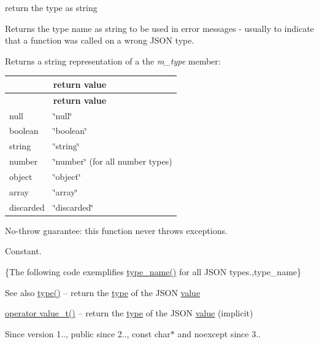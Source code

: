 return the type as string 

Returns the type name as string to be used in error messages -\/ usually to indicate that a function was called on a wrong J\+S\+ON type.

\begin{DoxyReturn}{Returns}
a string representation of a the {\itshape m\+\_\+type} member\+: \tabulinesep=1mm
\begin{longtabu} spread 0pt [c]{*2{|X[-1]}|}
\hline
{}&{\bf return value  }\\
\endfirsthead
\hline
\endfoot
\hline
{}&{\bf return value  }\\
\endhead
null &{\ttfamily \char`\"{}null\char`\"{}} \\
boolean &{\ttfamily \char`\"{}boolean\char`\"{}} \\
string &{\ttfamily \char`\"{}string\char`\"{}} \\
number &{\ttfamily \char`\"{}number\char`\"{}} (for all number types) \\
object &{\ttfamily \char`\"{}object\char`\"{}} \\
array &{\ttfamily \char`\"{}array\char`\"{}} \\
discarded &{\ttfamily \char`\"{}discarded\char`\"{}} \\
\end{longtabu}
No-\/throw guarantee\+: this function never throws exceptions.
\end{DoxyReturn}
Constant.

\{The following code exemplifies {\ttfamily \hyperlink{classnlohmann_1_1basic__json_a9d75f6b5393b23a683d69605f9fb1f55}{type\+\_\+name()}} for all J\+S\+ON types.,type\+\_\+name\}

\begin{DoxySeeAlso}{See also}
\hyperlink{classnlohmann_1_1basic__json_a2b2d781d7f2a4ee41bc0016e931cadf7}{type()} -- return the \hyperlink{classnlohmann_1_1basic__json_a2b2d781d7f2a4ee41bc0016e931cadf7}{type} of the J\+S\+ON \hyperlink{classnlohmann_1_1basic__json_a404017aa52714a0a4bc79d5af7e4ad2b}{value} 

\hyperlink{classnlohmann_1_1basic__json_a26ef3058e249f82a04f8ec18f7419027}{operator value\+\_\+t()} -- return the \hyperlink{classnlohmann_1_1basic__json_a2b2d781d7f2a4ee41bc0016e931cadf7}{type} of the J\+S\+ON \hyperlink{classnlohmann_1_1basic__json_a404017aa52714a0a4bc79d5af7e4ad2b}{value} (implicit)
\end{DoxySeeAlso}
\begin{DoxySince}{Since}
version 1.., public since 2.., {\ttfamily const char$\ast$} and {\ttfamily noexcept} since 3.. 
\end{DoxySince}
